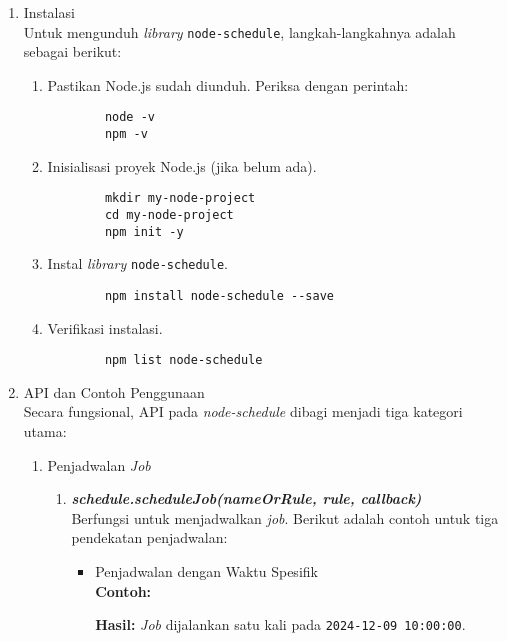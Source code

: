 \begin{enumerate}[label*=\arabic*.,ref=\arabic*]
\begin{enumerate}[label*=\arabic*.,ref=\arabic*]
    \end{enumerate}
        
    \item Instalasi\\
    Untuk mengunduh \textit{library} \texttt{node-schedule}, langkah-langkahnya adalah sebagai berikut:
    
    \begin{enumerate}[label*=\arabic*.,ref=\arabic*]
        \item Pastikan Node.js sudah diunduh.
        Periksa dengan perintah:
        \begin{verbatim}
        node -v
        npm -v
        \end{verbatim}

        \item Inisialisasi proyek Node.js (jika belum ada).
        \begin{verbatim}
        mkdir my-node-project
        cd my-node-project
        npm init -y
        \end{verbatim}

        \item Instal \textit{library} \texttt{node-schedule}.
        \begin{verbatim}
        npm install node-schedule --save
        \end{verbatim}

        \item Verifikasi instalasi.
        \begin{verbatim}
        npm list node-schedule
        \end{verbatim}
    \end{enumerate}
        
    \item API dan Contoh Penggunaan\\
    Secara fungsional, API pada \textit{node-schedule} dibagi menjadi tiga kategori utama:
    
    \begin{enumerate}[label*=\arabic*.,ref=\arabic*]
        \item Penjadwalan \textit{Job}\\
            
        \begin{enumerate}[label=\alph*.]
            \item \textbf{\textit{schedule.scheduleJob(nameOrRule, rule, callback)}}\\
            Berfungsi untuk menjadwalkan \textit{job}. Berikut adalah contoh untuk tiga pendekatan penjadwalan: \\
            \begin{itemize}
                \item Penjadwalan dengan Waktu Spesifik\\
                \textbf{Contoh:}
                
                \textbf{Hasil:} \textit{Job} dijalankan satu kali pada \texttt{2024-12-09 10:00:00}.


\end{itemize}
\end{enumerate}
\end{enumerate}
\end{enumerate}
